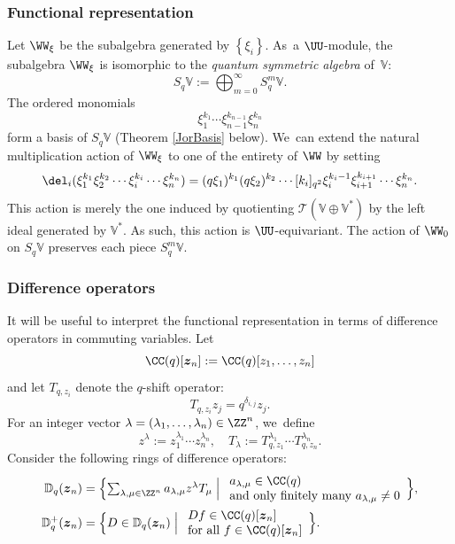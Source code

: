 \subsubsection{Functional representation}
Let $\WW_{\xi}$ be the subalgebra generated by $\left\{ \xi_i \right\}$.
As~a $\UU$-module, the subalgebra $\WW_{\xi}$ is isomorphic to the \textit{quantum symmetric algebra} of~$\mathbb{V}$:
\[
S_q\mathbb{V}:=\bigoplus_{m=0}^\infty S_q^m\mathbb{V}.
\]
The ordered monomials
\[
\xi_1^{k_1}\cdots \xi_{n-1}^{k_{n-1}}\xi_n^{k_n}
\]
form a basis of $S_q\mathbb{V}$ (\cf Theorem \ref{JorBasis} below). We~can extend the natural multiplication action of $\WW_\xi$ to one of the entirety of $\WW$ by setting
\begin{equation*}
\del_i(\xi_1^{k_1}\xi_{2}^{k_{2}}\cdots \xi_{i}^{k_i}\cdots \xi_n^{k_n})=(q\xi_{1})^{k_{1}}(q\xi_{2})^{k_{2}}\cdots [k_i]_{q^2}\xi_i^{k_{i}-1}\xi_{i+1}^{k_{i+1}}\cdots \xi_n^{k_n}.
\end{equation*}
This action is merely the one induced by quotienting $\mathcal{T}(\mathbb{V}\oplus\mathbb{V}^*)$ by the left ideal generated by $\mathbb{V}^*$.
As such, this action is $\UU$-equivariant.
The action of $\WW_0$ on $S_q\mathbb{V}$ preserves each piece $S_q^m\mathbb{V}$.

\subsubsection{Difference operators}\label{WeylDiff}
It will be useful to interpret the functional representation in terms of difference operators in commuting variables.
Let
\[
\CC(q)[\boldsymbol{z}_n]:=\CC(q)[z_1,\ldots, z_n]
\]
and let $T_{q,z_i}$ denote the $q$-shift operator:
\[
T_{q,z_i}z_j=q^{\delta_{i,j}}z_j.
\]
For an integer vector $\lambda=(\lambda_1,\ldots,\lambda_n)\in\ZZ^n$, we~define
\[
z^\lambda:=z_1^{\lambda_1}\cdots z_n^{\lambda_n},\quad
T_\lambda:=T_{q,z_1}^{\lambda_1}\cdots T_{q,z_n}^{\lambda_n}.
\]
Consider the following rings of difference operators:
\begin{align*}
\mathbb{D}_q(\boldsymbol{z}_n)&= \Bigl\{ \textstyle\sum_{\lambda,\mu\in\ZZ^n}a_{\lambda,\mu}z^\lambda T_\mu\Bigm|
\begin{array}{l}
a_{\lambda,\mu}\in \CC(q) \\
\hbox{and only finitely many }a_{\lambda,\mu}\not=0
\end{array}
\Bigr\},\\
\mathbb{D}_q^+(\boldsymbol{z}_n)&= \Bigl\{ D\in \mathbb{D}_q(\boldsymbol{z}_n)\Bigm|
\begin{array}{l}
Df\in\CC(q)[\boldsymbol{z}_n]\\
\hbox{for all }f\in\CC(q)[\boldsymbol{z}_n]
\end{array}
\Bigr\}.
\end{align*}

